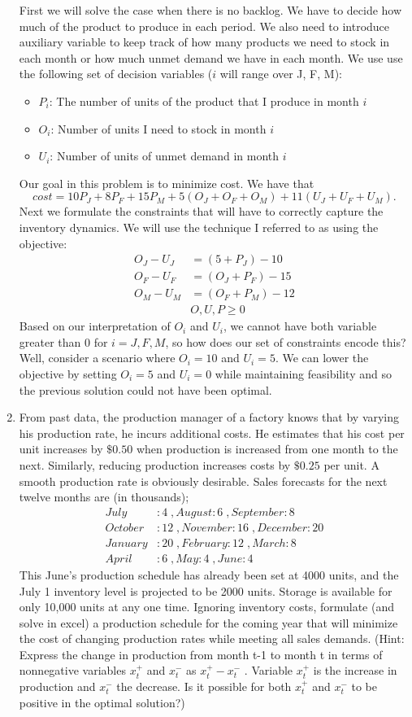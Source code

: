 \documentclass{article}[11 pt]    %
\begin{document}
\begin{enumerate}
First we will solve the case when there is no backlog.  We have to decide how much of the product to produce in each period.  We also need to introduce auxiliary variable to keep track of how many products we need to stock in each month or how much unmet demand we have in each month.  We use use the following set of decision variables ($i$ will range over J, F, M):
\begin{itemize}
\item $P_i$: The number of units of the product that I produce in month $i$
\item $O_i$:  Number of units I need to stock in month $i$
\item $U_i$: Number of units of unmet demand in month $i$
\end{itemize}
Our goal in this problem is to minimize cost.  We have that $$cost=10P_J + 8P_F + 15P_M + 5(O_J + O_F + O_M) + 11(U_J + U_F + U_M).$$
Next we formulate the constraints that will have to correctly capture the inventory dynamics.  We will use the technique I referred to as using the objective:
\begin{align*}
O_J -U_J &= (5+P_J)-10\\
O_F -U_F &= (O_J+P_F)-15\\
O_M -U_M &= (O_F+P_M)-12\\
&O,U,P\geq 0
\end{align*}
Based on our interpretation of $O_i$ and $U_i$, we cannot have both variable greater than 0 for $i=J,F,M$, so how does our set of constraints encode this?  Well, consider a scenario where $O_i=10$ and $U_i=5$.  We can lower the objective by setting $O_i=5$ and $U_i=0$ while maintaining feasibility and so the previous solution could not have been optimal.
\item From past data, the production manager of a factory knows that by varying his production rate, he incurs additional costs. He estimates that his cost per unit increases by $\$0.50$ when production is increased from one month to the next. Similarly, reducing production increases costs by $\$0.25$ per unit. A smooth production rate is obviously desirable.
Sales forecasts for the next twelve months are (in thousands);
\begin{align*}
July&:4 \;,August:6\; ,September:8\\
October&:12\;, November:16\;, December:20\\
January&:20 \;, February:12\;, March:8\\
April&:6 \;, May:4 \;, June:4
\end{align*}
This June's production schedule has already been set at 4000 units, and the July 1 inventory level is projected to be 2000 units. Storage is available for only 10,000 units at any one time. Ignoring inventory costs, formulate (and solve in excel) a production schedule for the coming year that will minimize the cost of changing production rates while meeting all sales demands. (Hint: Express the change in production from month t-1 to month t in terms of nonnegative variables $x_t^+$ and $x_t^-$ as $x_t^+ - x_t^-$ . Variable $x_t^+$ is the increase in production and $x_t^-$ the decrease. Is it possible for both $x_t^+$ and $x_t^-$ to be positive in the optimal solution?)


\end{enumerate}
\end{document}
